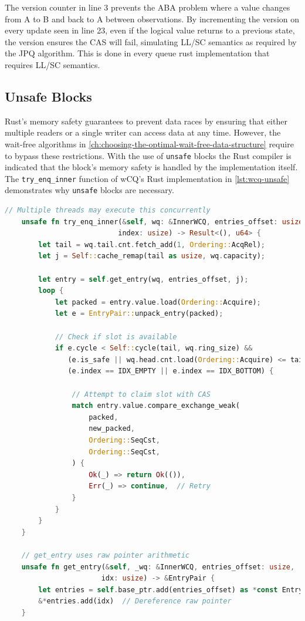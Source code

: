 The version counter in line 3 prevents the ABA problem where a value changes from A to B and back to A between observations. By incrementing the version on every update seen in line 23, even if the logical value returns to a previous state, the version ensures the \ac{CAS} will fail, simulating \ac{LL/SC} semantics as required by the \ac{JPQ} algorithm. This is done in every queue rust implementation that requires \ac{LL/SC} semantics.

\subsection{Unsafe Blocks}

Rust's memory safety guarantees to prevent data races by ensuring that either multiple readers or a single writer can access data at any time. However, the wait-free algorithms in \cref{ch:choosing-the-optimal-wait-free-data-structure} require to bypass these restrictions. With the use of \texttt{unsafe} blocks the Rust compiler is indicated that the block's memory safety is handled by the implementation itself. The \texttt{try\_enq\_inner} function of \ac{wCQ}'s Rust implementation in \cref{lst:wcq-unsafe} demonstrates why \texttt{unsafe} blocks are necessary.

\begin{lstlisting}[language=Rust, style=boxed, caption={Wait-free synchronisation requiring unsafe}, label={lst:wcq-unsafe}]
    // Multiple threads may execute this concurrently
    unsafe fn try_enq_inner(&self, wq: &InnerWCQ, entries_offset: usize,
                           index: usize) -> Result<(), u64> {
        let tail = wq.tail.cnt.fetch_add(1, Ordering::AcqRel);
        let j = Self::cache_remap(tail as usize, wq.capacity);
        
        let entry = self.get_entry(wq, entries_offset, j);
        loop {
            let packed = entry.value.load(Ordering::Acquire);
            let e = EntryPair::unpack_entry(packed);
            
            // Check if slot is available
            if e.cycle < Self::cycle(tail, wq.ring_size) &&
               (e.is_safe || wq.head.cnt.load(Ordering::Acquire) <= tail) &&
               (e.index == IDX_EMPTY || e.index == IDX_BOTTOM) {
                
                // Attempt to claim slot with CAS
                match entry.value.compare_exchange_weak(
                    packed,
                    new_packed,
                    Ordering::SeqCst,
                    Ordering::SeqCst,
                ) {
                    Ok(_) => return Ok(()),
                    Err(_) => continue,  // Retry
                }
            }
        }
    }
    
    // get_entry uses raw pointer arithmetic
    unsafe fn get_entry(&self, _wq: &InnerWCQ, entries_offset: usize, 
                       idx: usize) -> &EntryPair {
        let entries = self.base_ptr.add(entries_offset) as *const EntryPair;
        &*entries.add(idx)  // Dereference raw pointer
    }
\end{lstlisting}


